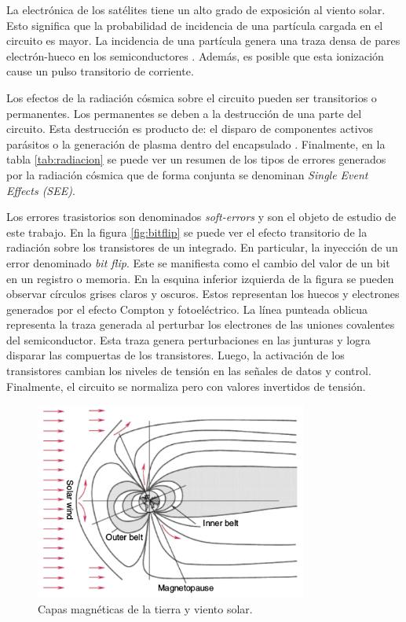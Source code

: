La electrónica de los satélites tiene un alto grado de exposición al viento solar.
Esto significa que la probabilidad de incidencia de una partícula cargada en el circuito es mayor.
La incidencia de una partícula genera una traza densa de pares electrón-hueco en los semiconductores \citep{ARTICLE:velazco}.
Además, es posible que esta ionización cause un pulso transitorio de corriente.

Los efectos de la radiación cósmica sobre el circuito pueden ser transitorios o permanentes.
Los permanentes se deben a la destrucción de una parte del circuito.
Esta destrucción es producto de: el disparo de componentes activos parásitos o la generación de plasma dentro del encapsulado \citep{WEBSITE:effects_on_devices}.
Finalmente, en la tabla \ref{tab:radiacion} se puede ver un resumen de los tipos de errores generados por la radiación cósmica que de forma conjunta se denominan \emph{Single Event Effects (SEE)}.

Los errores trasistorios son denominados \emph{soft-errors} y son el objeto de estudio de este trabajo.
En la figura \ref{fig:bitflip} se puede ver el efecto transitorio de la radiación sobre los transistores de un integrado.
En particular, la inyección de un error denominado \emph{bit flip}.
Este se manifiesta como el cambio del valor de un bit en un registro o memoria.
En la esquina inferior izquierda de la figura se pueden observar círculos grises claros y oscuros.
Estos representan los huecos y electrones generados por el efecto Compton \citep{BOOK:comptom} y fotoeléctrico.
La línea punteada oblicua representa la traza generada al perturbar los electrones de las uniones covalentes del semiconductor.
Esta traza genera perturbaciones en las junturas y logra disparar las compuertas de los transistores.
Luego, la activación de los transistores cambian los niveles de tensión en las señales de datos y control.
Finalmente, el circuito se normaliza pero con valores invertidos de tensión.

\begin{figure}[htbp]
	\centering
	\includegraphics[width=0.8\textwidth]{./Figures/vientosolar.jpg}
    \caption{Capas magnéticas de la tierra y viento solar\protect\footnotemark.}
	\label{fig:viento}
\end{figure}

